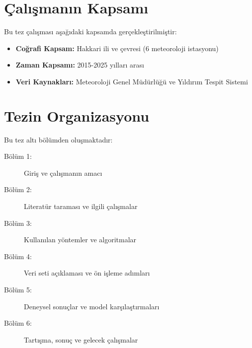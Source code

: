 \section{Çalışmanın Kapsamı}

Bu tez çalışması aşağıdaki kapsamda gerçekleştirilmiştir:

\begin{itemize}
    \item \textbf{Coğrafi Kapsam:} Hakkari ili ve çevresi (6 meteoroloji istasyonu)
    \item \textbf{Zaman Kapsamı:} 2015-2025 yılları arası
    \item \textbf{Veri Kaynakları:} Meteoroloji Genel Müdürlüğü ve Yıldırım Tespit Sistemi
\end{itemize}

\section{Tezin Organizasyonu}

Bu tez altı bölümden oluşmaktadır:

\begin{description}
    \item[Bölüm 1:] Giriş ve çalışmanın amacı
    \item[Bölüm 2:] Literatür taraması ve ilgili çalışmalar
    \item[Bölüm 3:] Kullanılan yöntemler ve algoritmalar
    \item[Bölüm 4:] Veri seti açıklaması ve ön işleme adımları
    \item[Bölüm 5:] Deneysel sonuçlar ve model karşılaştırmaları
    \item[Bölüm 6:] Tartışma, sonuç ve gelecek çalışmalar
\end{description}
